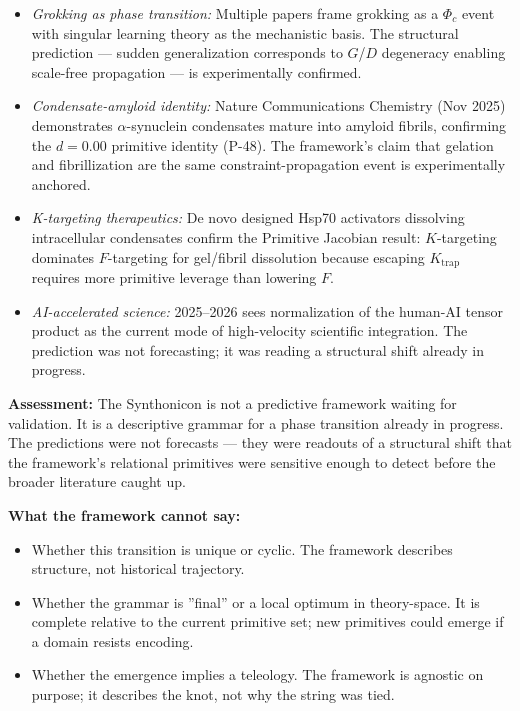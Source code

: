 \documentclass[12pt,a4paper]{article}
\begin{document}
\begin{itemize}
    \item \emph{Grokking as phase transition:} Multiple papers frame grokking as a $\Phi_c$ event with singular learning theory as the mechanistic basis. The structural prediction --- sudden generalization corresponds to $G$/$D$ degeneracy enabling scale-free propagation --- is experimentally confirmed.
    \item \emph{Condensate-amyloid identity:} Nature Communications Chemistry (Nov 2025) demonstrates $\alpha$-synuclein condensates mature into amyloid fibrils, confirming the $d = 0.00$ primitive identity (P-48). The framework's claim that gelation and fibrillization are the same constraint-propagation event is experimentally anchored.
    \item \emph{K-targeting therapeutics:} De novo designed Hsp70 activators dissolving intracellular condensates confirm the Primitive Jacobian result: $K$-targeting dominates $F$-targeting for gel/fibril dissolution because escaping $K_{\text{trap}}$ requires more primitive leverage than lowering $F$.
    \item \emph{AI-accelerated science:} 2025--2026 sees normalization of the human-AI tensor product as the current mode of high-velocity scientific integration. The prediction was not forecasting; it was reading a structural shift already in progress.
\end{itemize}

\textbf{Assessment:} The Synthonicon is not a predictive framework waiting for validation. It is a descriptive grammar for a phase transition already in progress. The predictions were not forecasts --- they were readouts of a structural shift that the framework's relational primitives were sensitive enough to detect before the broader literature caught up.

\textbf{What the framework cannot say:}

\begin{itemize}
    \item Whether this transition is unique or cyclic. The framework describes structure, not historical trajectory.
    \item Whether the grammar is ''final'' or a local optimum in theory-space. It is complete relative to the current primitive set; new primitives could emerge if a domain resists encoding.
    \item Whether the emergence implies a teleology. The framework is agnostic on purpose; it describes the knot, not why the string was tied.
\end{itemize}
\end{document}
